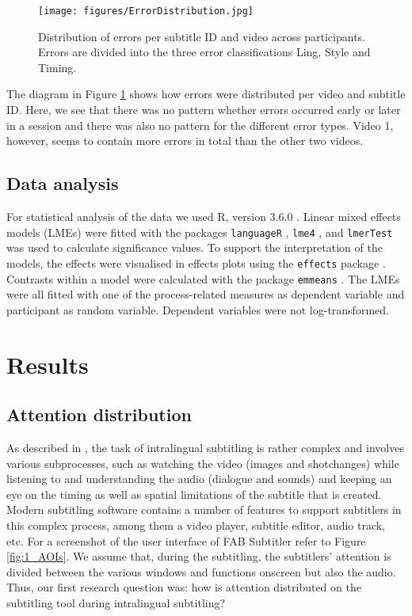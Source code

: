 \documentclass[output=paper]{langscibook}
\begin{document}
\begin{figure}
\texttt{[image: figures/ErrorDistribution.jpg]}
%
\caption{Distribution of errors per subtitle ID and video across participants.
Errors are divided into the three error classifications Ling, Style and Timing.\label{fig:2_errors}}
\end{figure}

The diagram in Figure \ref{fig:2_errors} shows how errors were distributed per video and subtitle ID.
Here, we see that there was no pattern whether errors occurred early or later in a session and there was also no pattern for the different error types.
Video 1, however, seems to contain more errors in total than the other two videos.

\subsection{Data analysis}
For statistical analysis of the data we used R, version 3.6.0 \citep{R}.
Linear mixed effects models (LMEs) were fitted with the packages \texttt{languageR} \citep{baayen2019package}, \texttt{lme4} \citep{Bates2015lme4}, and \texttt{lmerTest} \citep{Kuznetova2017lmerTest} was used to calculate significance values.
To support the interpretation of the models, the effects were visualised in effects plots using the \texttt{effects} package \citep{Fox2009effects}.
Contrasts within a model were calculated with the package \texttt{emmeans} \citep{lenth_emmeans_2019}.
The LMEs were all fitted with one of the process-related measures as dependent variable and participant as random variable.
Dependent variables were not log-transformed.

\section{Results} 
\subsection{Attention distribution}
As described in , the task of intralingual subtitling is rather complex and involves various subprocesses, such as watching the video (images and shot\linebreak changes) while listening to and understanding the audio (dialogue and sounds) and keeping an eye on the timing as well as spatial limitations of the subtitle that is created.
Modern subtitling software contains a number of features to support subtitlers in this complex process, among them a video player, subtitle editor, audio track, etc.
For a screenshot of the user interface of FAB Subtitler refer to Figure \ref{fig:1_AOIs}.
We assume that, during the subtitling, the subtitlers' attention is divided between the various windows and functions onscreen but also the audio.
Thus, our first research question was: how is attention distributed on the subtitling tool during intralingual subtitling?
\end{document}
